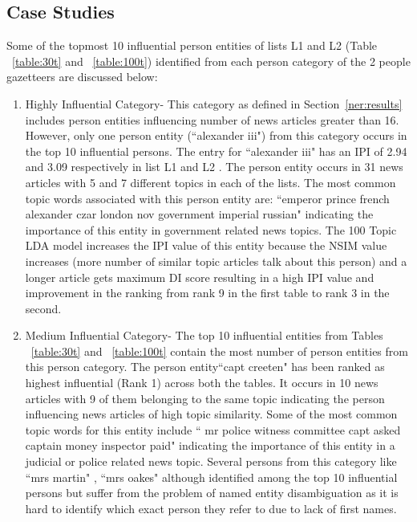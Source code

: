 \documentclass[10pt,journal,compsoc]{IEEEtran}
\begin{document}
  \subsection{Case Studies}

Some of the topmost 10 influential person entities of lists L1 and L2  (Table ~\ref{table:30t} and ~\ref{table:100t}) identified from each person category of the 2 people gazetteers are discussed below: 
\begin{enumerate}

\item
Highly Influential Category- This category as defined in Section~\ref{ner:results} includes person entities influencing number of news articles greater than 16. However, only one person entity (``alexander iii") from this category occurs in the top 10 influential persons. The entry for ``alexander iii" has an IPI of 2.94 and 3.09 respectively in list L1 and L2 . The person entity occurs in 31 news articles with 5 and 7 different topics in each of the lists. The most common topic words associated with this person entity are: ``emperor prince french alexander czar london nov government imperial russian" indicating the importance of this entity in government related news topics. The 100 Topic LDA model increases the IPI value of this entity because the NSIM value increases (more number of similar topic articles talk about this person) and a longer article gets maximum DI score resulting in a high IPI value and improvement in the ranking from rank 9 in the first table to rank 3 in the second.

\item
Medium Influential Category- The top 10 influential entities from Tables ~\ref{table:30t} and ~\ref{table:100t} contain the most number of person entities from this person category. The person entity``capt creeten" has been ranked as highest influential (Rank 1) across both the tables. It occurs in 10 news articles with 9 of them belonging to the same topic indicating the person influencing news articles of high topic similarity. Some of the most common topic words for this entity include `` mr police witness committee capt asked captain money inspector paid" indicating the importance of this entity in a judicial or police related news topic.
Several persons from this category like ``mrs martin" , ``mrs oakes"  although identified among the top 10 influential persons but suffer from the problem of named entity disambiguation as it is hard to identify which exact person they refer to due to lack of first names.
 

\end{enumerate}
\end{document}
